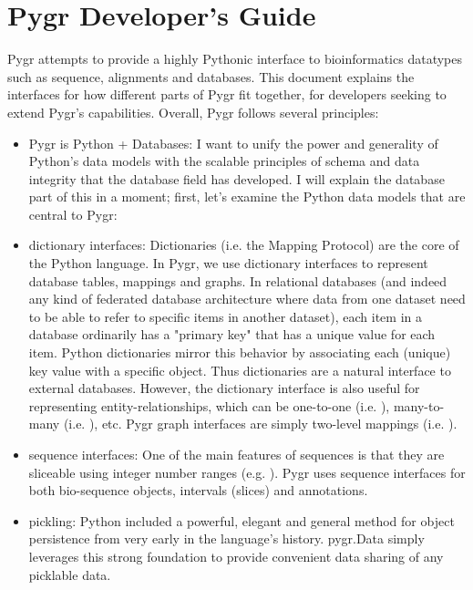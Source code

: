 \documentclass{howto}
\begin{document}
\section{Pygr Developer's Guide}
\label{api-doc}

Pygr attempts to provide a highly Pythonic interface to bioinformatics datatypes
such as sequence, alignments and databases.  This document explains the interfaces
for how different parts of Pygr fit together, for developers seeking to extend
Pygr's capabilities.  Overall, Pygr follows several principles:
\begin{itemize}
\item Pygr is Python + Databases: I want to unify the power and generality of
Python's data models with the scalable principles of schema and data integrity
that the database field has developed.  I will explain the database part of
this in a moment; first, let's examine the Python data models that are central
to Pygr:

\item dictionary interfaces: Dictionaries (i.e. the Mapping Protocol) are
the core of the Python language.  In Pygr, we use dictionary interfaces to 
represent database tables, mappings and graphs.  In relational databases
(and indeed any kind of federated database architecture where data from one
dataset need to be able to refer to specific items in another dataset),
each item in a database ordinarily has a "primary key" that has a unique
value for each item.  Python dictionaries mirror this behavior by associating
each (unique) key value with a specific object.  Thus dictionaries are a
natural interface to external databases.  However, the dictionary interface
is also useful for representing entity-relationships, which can be one-to-one
(i.e. ), many-to-many (i.e. ), etc.  Pygr
graph interfaces are simply two-level mappings (i.e. ).

\item sequence interfaces: One of the main features of sequences is that they
are sliceable using integer number ranges (e.g. ).  Pygr uses
sequence interfaces for both bio-sequence objects, intervals (slices) and 
annotations.

\item pickling: Python included a powerful, elegant and general method for
object persistence from very early in the language's history.  pygr.Data simply
leverages this strong foundation to provide convenient data sharing of 
any picklable data.
\end{itemize}
\end{document}
